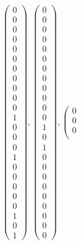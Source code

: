 \documentclass[8pt]{article}
\begin{document}
 \newline \begin{align*}
 \left(\begin{array}{r}
0 \\
0 \\
0 \\
0 \\
0 \\
0 \\
0 \\
0 \\
0 \\
0 \\
0 \\
1 \\
0 \\
0 \\
0 \\
1 \\
0 \\
0 \\
0 \\
0 \\
0 \\
1 \\
0 \\
1
\end{array}\right) ,
 \left(\begin{array}{r}
0 \\
0 \\
0 \\
0 \\
0 \\
0 \\
0 \\
0 \\
0 \\
0 \\
0 \\
0 \\
1 \\
0 \\
1 \\
0 \\
0 \\
0 \\
0 \\
0 \\
0 \\
0 \\
0 \\
0
\end{array}\right) ,
 \left(\begin{array}{r}
0 \\
0 \\
0 \\

\end{array}
\end{align*}
\end{document}
